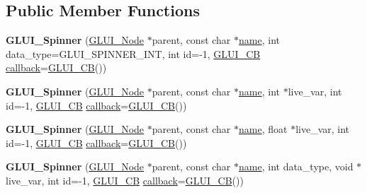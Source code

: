 \subsection*{Public Member Functions}
\begin{DoxyCompactItemize}
\item 
\hypertarget{classGLUI__Spinner_a7a0a9950bfea2df037b2f13b21585d7b}{{\bfseries G\-L\-U\-I\-\_\-\-Spinner} (\hyperlink{classGLUI__Node}{G\-L\-U\-I\-\_\-\-Node} $\ast$parent, const char $\ast$\hyperlink{classGLUI__Control_aa95b97d50df45335fc33f0af03958eb3}{name}, int data\-\_\-type=G\-L\-U\-I\-\_\-\-S\-P\-I\-N\-N\-E\-R\-\_\-\-I\-N\-T, int id=-\/1, \hyperlink{classGLUI__CB}{G\-L\-U\-I\-\_\-\-C\-B} \hyperlink{classGLUI__Control_a96060fe0cc6d537e736dd6eef78e24ab}{callback}=\hyperlink{classGLUI__CB}{G\-L\-U\-I\-\_\-\-C\-B}())}\label{classGLUI__Spinner_a7a0a9950bfea2df037b2f13b21585d7b}

\item 
\hypertarget{classGLUI__Spinner_afdb231b113e73b8714a36effcc9edf94}{{\bfseries G\-L\-U\-I\-\_\-\-Spinner} (\hyperlink{classGLUI__Node}{G\-L\-U\-I\-\_\-\-Node} $\ast$parent, const char $\ast$\hyperlink{classGLUI__Control_aa95b97d50df45335fc33f0af03958eb3}{name}, int $\ast$live\-\_\-var, int id=-\/1, \hyperlink{classGLUI__CB}{G\-L\-U\-I\-\_\-\-C\-B} \hyperlink{classGLUI__Control_a96060fe0cc6d537e736dd6eef78e24ab}{callback}=\hyperlink{classGLUI__CB}{G\-L\-U\-I\-\_\-\-C\-B}())}\label{classGLUI__Spinner_afdb231b113e73b8714a36effcc9edf94}

\item 
\hypertarget{classGLUI__Spinner_ae1ea318b4c526ba0090a3989c3e87dfb}{{\bfseries G\-L\-U\-I\-\_\-\-Spinner} (\hyperlink{classGLUI__Node}{G\-L\-U\-I\-\_\-\-Node} $\ast$parent, const char $\ast$\hyperlink{classGLUI__Control_aa95b97d50df45335fc33f0af03958eb3}{name}, float $\ast$live\-\_\-var, int id=-\/1, \hyperlink{classGLUI__CB}{G\-L\-U\-I\-\_\-\-C\-B} \hyperlink{classGLUI__Control_a96060fe0cc6d537e736dd6eef78e24ab}{callback}=\hyperlink{classGLUI__CB}{G\-L\-U\-I\-\_\-\-C\-B}())}\label{classGLUI__Spinner_ae1ea318b4c526ba0090a3989c3e87dfb}

\item 
\hypertarget{classGLUI__Spinner_ac78385b3436ef915b5e706f1f1b19b49}{{\bfseries G\-L\-U\-I\-\_\-\-Spinner} (\hyperlink{classGLUI__Node}{G\-L\-U\-I\-\_\-\-Node} $\ast$parent, const char $\ast$\hyperlink{classGLUI__Control_aa95b97d50df45335fc33f0af03958eb3}{name}, int data\-\_\-type, void $\ast$live\-\_\-var, int id=-\/1, \hyperlink{classGLUI__CB}{G\-L\-U\-I\-\_\-\-C\-B} \hyperlink{classGLUI__Control_a96060fe0cc6d537e736dd6eef78e24ab}{callback}=\hyperlink{classGLUI__CB}{G\-L\-U\-I\-\_\-\-C\-B}())}\label{classGLUI__Spinner_ac78385b3436ef915b5e706f1f1b19b49}


\end{DoxyCompactItemize}
